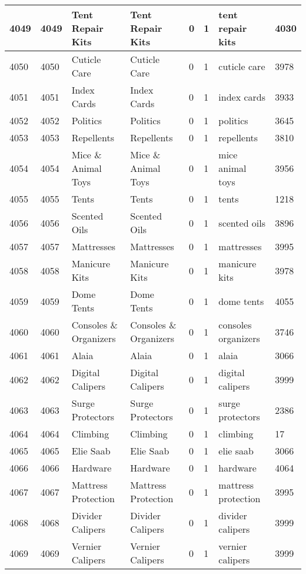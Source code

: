 \begin{longtable}{|l|l|l|l|l|l|l|l|}
4049 & 4049 & Tent Repair Kits & Tent Repair Kits & 0 & 1 & tent repair kits & 4030 \\ \hline 
4050 & 4050 & Cuticle Care & Cuticle Care & 0 & 1 & cuticle care & 3978 \\ \hline 
4051 & 4051 & Index Cards & Index Cards & 0 & 1 & index cards & 3933 \\ \hline 
4052 & 4052 & Politics & Politics & 0 & 1 & politics & 3645 \\ \hline 
4053 & 4053 & Repellents & Repellents & 0 & 1 & repellents & 3810 \\ \hline 
4054 & 4054 & Mice \& Animal Toys & Mice \& Animal Toys & 0 & 1 & mice animal toys & 3956 \\ \hline 
4055 & 4055 & Tents & Tents & 0 & 1 & tents & 1218 \\ \hline 
4056 & 4056 & Scented Oils & Scented Oils & 0 & 1 & scented oils & 3896 \\ \hline 
4057 & 4057 & Mattresses & Mattresses & 0 & 1 & mattresses & 3995 \\ \hline 
4058 & 4058 & Manicure Kits & Manicure Kits & 0 & 1 & manicure kits & 3978 \\ \hline 
4059 & 4059 & Dome Tents & Dome Tents & 0 & 1 & dome tents & 4055 \\ \hline 
4060 & 4060 & Consoles \& Organizers & Consoles \& Organizers & 0 & 1 & consoles organizers & 3746 \\ \hline 
4061 & 4061 & Alaia & Alaia & 0 & 1 & alaia & 3066 \\ \hline 
4062 & 4062 & Digital Calipers & Digital Calipers & 0 & 1 & digital calipers & 3999 \\ \hline 
4063 & 4063 & Surge Protectors & Surge Protectors & 0 & 1 & surge protectors & 2386 \\ \hline 
4064 & 4064 & Climbing & Climbing & 0 & 1 & climbing & 17 \\ \hline 
4065 & 4065 & Elie Saab & Elie Saab & 0 & 1 & elie saab & 3066 \\ \hline 
4066 & 4066 & Hardware & Hardware & 0 & 1 & hardware & 4064 \\ \hline 
4067 & 4067 & Mattress Protection & Mattress Protection & 0 & 1 & mattress protection & 3995 \\ \hline 
4068 & 4068 & Divider Calipers & Divider Calipers & 0 & 1 & divider calipers & 3999 \\ \hline 
4069 & 4069 & Vernier Calipers & Vernier Calipers & 0 & 1 & vernier calipers & 3999 \\ \hline 

\end{longtable}
